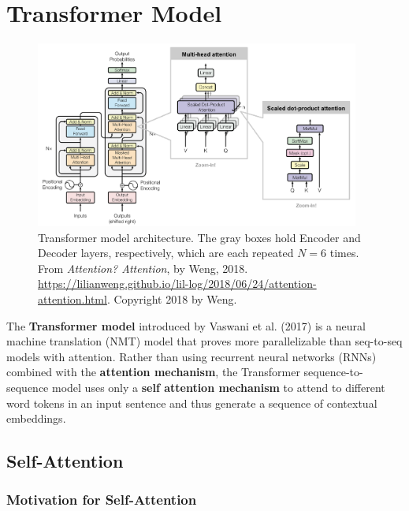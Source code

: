 \section{Transformer Model} \label{Transformer}

\begin{figure}[h]
\vspace{-10pt}
\centering
\includegraphics[width=0.95\textwidth]{imgs/transformer.png}
\vspace{-10pt}
\caption{\footnotesize Transformer model architecture. The gray boxes hold Encoder and Decoder layers, respectively, which are each repeated $N=6$ times. From \emph{Attention? Attention}, by Weng, 2018. \url{https://lilianweng.github.io/lil-log/2018/06/24/attention-attention.html}. Copyright 2018 by Weng.}
\vspace{-5pt}
\end{figure}

The \textbf{Transformer model} introduced by Vaswani et al. (2017) is a neural machine translation (NMT) model that proves more parallelizable than seq-to-seq models with attention. Rather than using recurrent neural networks (RNNs) combined with the \textbf{attention mechanism}, the Transformer sequence-to-sequence model uses only a \textbf{self attention mechanism} to attend to different word tokens in an input sentence and thus generate a sequence of contextual embeddings. 





\subsection{Self-Attention}

\subsubsection{Motivation for Self-Attention}

